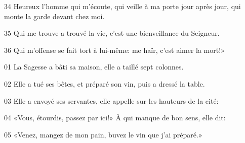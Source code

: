 34 Heureux l’homme qui m’écoute, qui veille à ma porte jour après jour, qui monte la garde devant chez moi.

35 Qui me trouve a trouvé la vie, c’est une bienveillance du Seigneur.

36 Qui m’offense se fait tort à lui-même: me haïr, c’est aimer la mort!»

01 La Sagesse a bâti sa maison, elle a taillé sept colonnes.

02 Elle a tué ses bêtes, et préparé son vin, puis a dressé la table.

03 Elle a envoyé ses servantes, elle appelle sur les hauteurs de la cité:

04 «Vous, étourdis, passez par ici!» À qui manque de bon sens, elle dit:

05 «Venez, mangez de mon pain, buvez le vin que j’ai préparé.»